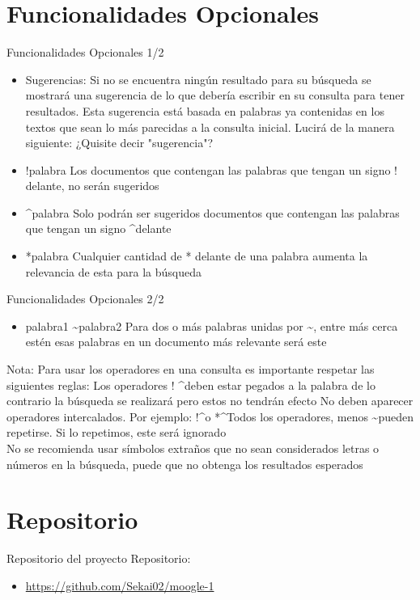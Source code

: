 \documentclass{beamer}
\begin{document}
\section{Funcionalidades Opcionales}
\begin{frame}{Funcionalidades Opcionales 1/2}
    \begin{itemize}
        \item Sugerencias: Si no se encuentra ningún resultado para su búsqueda se mostrará una sugerencia de lo que debería escribir en su consulta para tener resultados. Esta sugerencia está basada en palabras ya contenidas en los textos que sean lo más parecidas a la consulta inicial. Lucirá de la manera siguiente:
        ¿Quisite decir "sugerencia"?
        \item !palabra Los documentos que contengan las palabras que tengan un signo ! delante, no serán sugeridos
        \item \textasciicircum palabra Solo podrán ser sugeridos documentos que contengan las palabras que tengan un signo \textasciicircum  delante
        \item *palabra Cualquier cantidad de * delante de una palabra aumenta la relevancia de esta para la búsqueda
    \end{itemize}
\end{frame}

\begin{frame}{Funcionalidades Opcionales 2/2}
    \begin{itemize}
        \item palabra1 \textasciitilde  palabra2 Para dos o más palabras unidas por \textasciitilde, entre más cerca estén esas palabras en un documento más relevante será este
    \end{itemize}

    Nota:
    Para usar los operadores en una consulta es importante respetar las siguientes reglas: Los operadores ! \textasciicircum * deben estar pegados a la palabra de lo contrario la búsqueda se realizará pero estos no tendrán efecto No deben aparecer operadores intercalados. Por ejemplo: !\textasciicircum o *\textasciicircum Todos los operadores, menos \textasciitilde pueden repetirse. Si lo repetimos, este será ignorado
    \\
    No se recomienda usar símbolos extraños que no sean considerados letras o números en la búsqueda, puede que no obtenga los resultados esperados
\end{frame}

\section{Repositorio}
\begin{frame}{Repositorio del proyecto}
    Repositorio:
    \begin{itemize}
        \item \href{https://github.com/Sekai02/moogle-1}{https://github.com/Sekai02/moogle-1}
    \end{itemize}
\end{frame}
\end{document}
